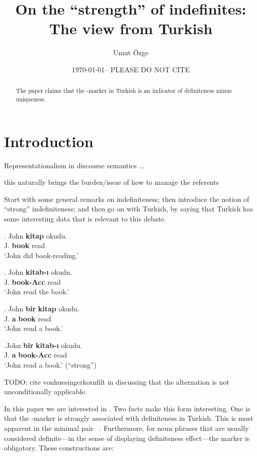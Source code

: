 \documentclass[11pt,a4paper]{article}
\title{On the ``strength'' of indefinites: The view from Turkish}
\author{Umut \"Ozge}
\date{\today -- PLEASE DO NOT CITE}
\begin{document}
\maketitle

\begin{abstract}
The paper claims that the \acc-marker in Turkish is an indicator of definiteness
minus uniqueness.
\end{abstract}

\section{Introduction}

Representationalism in discourse semantics
 ...

this naturally brings the burden/issue of how to manage the referents


Start with some general remarks on indefiniteness; then introduce the notion of
``strong'' indefiniteness; and then go on with Turkish, by saying that Turkish
has some interesting data that is relevant to this debate.

\exg. {\label{para-bare}John} {\bf kitap} {okudu.} \\
	{J.} {\bf book} {read}\\
`John did book-reading.'

\exg. {\label{para-def}John} {\bf kitab-{\i}}  {okudu.} \\
	{J.} {\bf book-Acc}	{read}\\
`John read the book.'

\exg. {\label{para-indef}John} {\bf bir} {\bf kitap} {okudu.}\\
	{J.} {\bf a}  {\bf book} {read}\\
`John read a book.'

\exg.{\label{para-acc}John} {\bf bir} {\bf kitab-{\i}} {okudu.}\\
	{J.} {\bf a} {\bf book-Acc} {read} \\
`John read a book.' (``strong'')


TODO: cite vonhuesingerkornfilt in discussing that the alternation is
not unconditionally applicable.



In this paper we are interested in . Two facts make this form
interesting. One is that the \acc-marker is strongly associated with
definiteness in Turkish. This is most apparent in the minimal pair
 \versus\ . Furthermore, for noun phrases that
are usually considered definite---in the sense of displaying definiteness
effect---the marker is obligatory. These constructions are:
\end{document}
